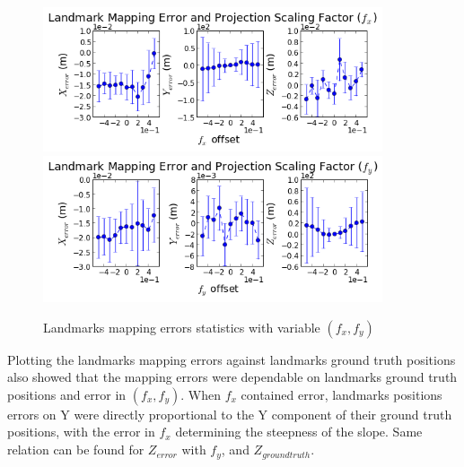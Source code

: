\begin{figure}[h]%
  \centering
  \includegraphics[width=10cm,keepaspectratio=true]{./Figures/SimulationFigures/Figure38.png}
  \includegraphics[width=10cm,keepaspectratio=true]{./Figures/SimulationFigures/Figure39.png}
  \caption{Landmarks mapping errors statistics with variable $(f_x, f_y)$}
  \label{fig:simfig38-39}
\end{figure}

Plotting the landmarks mapping errors against landmarks ground truth
positions also showed that the mapping errors were dependable on
landmarks ground truth positions and error in $(f_x, f_y)$. When $f_x$
contained error, landmarks positions errors on Y were directly
proportional to the Y component of their ground truth positions, with the
error in $f_x$ determining the steepness of the slope. Same relation can be
found for $Z_{error}$ with $f_y$, and $Z_{ground truth}$.

